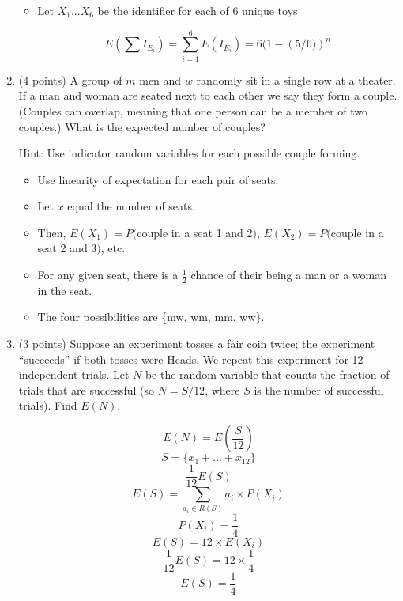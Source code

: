 \documentclass[11pt]{article}
\begin{document}
\begin{enumerate}
\begin{itemize}
	\item Let $X_1 ... X_6$ be the identifier for each of 6 unique toys
	
	\[ E\left(\sum I_{E_i}\right) = \sum_{i = 1}^6 E(I_{E_i}) = 6(1 - \left(5/6)\right)^n \]

\end{itemize}

\item (4 points) A group of $m$ men and $w$ randomly sit in a single row at a
theater.  If a man and woman are seated next to each other we say they form a
couple.  (Couples can overlap, meaning that one person can be a member of two
couples.)  What is the expected number of couples?
\begin{small}\textsf{Hint: Use indicator
random variables for each possible couple forming.
}\end{small}

\begin{itemize}

	\item Use linearity of expectation for each pair of seats.
	\item Let $x$ equal the number of seats.
	\item Then, $E(X_1) = P($couple in a seat 1 and 2$)$, $E(X_2) = P($couple in a seat 2 and 3$)$, etc.
	\item For any given seat, there is a $\frac{1}{2}$ chance of their being a man or a woman in the seat.
	\item The four possibilities are \{mw, wm, mm, ww\}.
	
\end{itemize}

\item (3 points) Suppose an experiment tosses a fair coin twice;  the experiment
``succeeds'' if both tosses were Heads.  We repeat this experiment 
for 12 independent trials.  Let $N$ be the random variable that counts
the fraction of trials that are successful (so $N = S/12$, where
$S$ is the number of successful trials).  Find $E(N)$.


	\[ E(N) = E\left(\frac{S}{12}\right) \]
	\[ S = \{ x_1 + ... + x_12 \} \]
	\[\frac{1}{12} E(S) \]
	\[E(S) = \sum_{a_i \in R(S)} a_i \times P(X_i) \]
	\[P(X_i) = \frac{1}{4} \]
	\[E(S) = 12 \times E(X_i) \]
	\[\frac{1}{12}E(S) = 12 \times \frac{1}{4} \]
	\[ E(S) = \frac{1}{4} \]


\end{enumerate}
\end{document}
